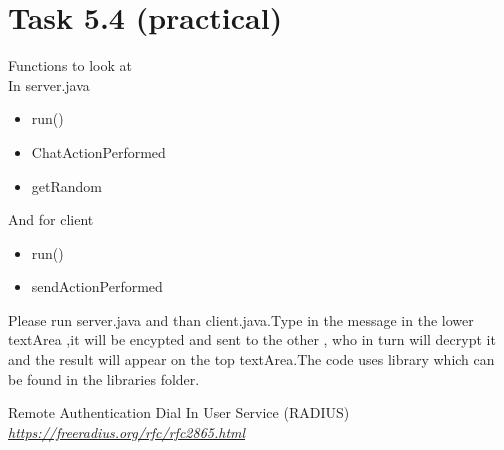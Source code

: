 \documentclass{article}
\begin{document}
\section *{Task 5.4 (practical)}
Functions to look at\\
In server.java
\begin{itemize}
\item run() 
\item ChatActionPerformed 
\item getRandom 
\end{itemize}
And for client
\begin{itemize}
\item run()\\
\item sendActionPerformed\\
\end{itemize}

Please run server.java and than client.java.Type in the message in the lower textArea ,it will be encypted and sent to the other , who in turn will decrypt it and the result will appear on the top textArea.The code uses library which can be found in the libraries folder.

\begin{thebibliography}{9}

  Remote Authentication Dial In User Service (RADIUS)
  \emph{\url{https://freeradius.org/rfc/rfc2865.html}}
    
\end{thebibliography}
\end{document}
